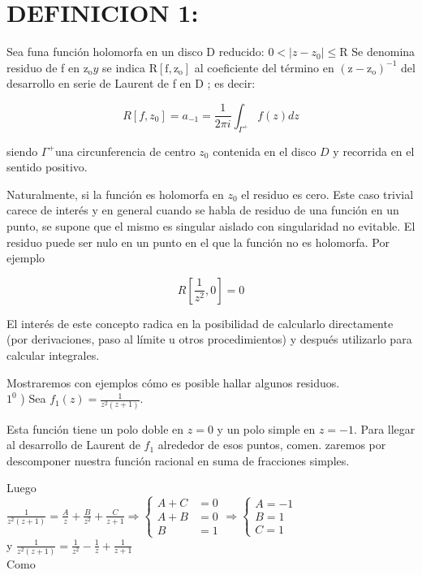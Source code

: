 \documentclass[10pt]{article}
\theoremstyle{plain}
\theoremstyle{definition}
\theoremstyle{remark}
\begin{document}
\section*{DEFINICION 1:}
Sea funa función holomorfa en un disco D reducido: $0<\left|z-z_{0}\right| \leqslant \mathrm{R}$ Se denomina residuo de f en $\mathrm{z}_{\mathrm{o}} y$ se indica $\mathrm{R}\left[\mathrm{f}, \mathrm{z}_{\mathrm{o}}\right]$ al coeficiente del término en $\left(\mathrm{z}-\mathrm{z}_{\mathrm{o}}\right)^{-1}$ del desarrollo en serie de Laurent de f en D ; es decir:


\begin{equation*}
R\left[f, z_{0}\right]=a_{-1}=\frac{1}{2 \pi i} \int_{\Gamma^{+}} f(z) d z \tag{20-1}
\end{equation*}


siendo $\Gamma^{+}$una circunferencia de centro $z_{0}$ contenida en el disco $D$ y recorrida en el sentido positivo.

Naturalmente, si la función es holomorfa en $z_{0}$ el residuo es cero. Este caso trivial carece de interés y en general cuando se habla de residuo de una función en un punto, se supone que el mismo es singular aislado con singularidad no evitable. El residuo puede ser nulo en un punto en el que la función no es holomorfa. Por ejemplo

$$
R\left[\frac{1}{z^{2}}, 0\right]=0
$$

El interés de este concepto radica en la posibilidad de calcularlo directamente (por derivaciones, paso al límite u otros procedimientos) y después utilizarlo para calcular integrales.

Mostraremos con ejemplos cómo es posible hallar algunos residuos.\\
$1^{0}$ ) Sea $f_{1}(z)=\frac{1}{z^{2}(z+1)}$.

Esta función tiene un polo doble en $z=0$ y un polo simple en $z=-1$. Para llegar al desarrollo de Laurent de $f_{1}$ alrededor de esos puntos, comen. zaremos por descomponer nuestra función racional en suma de fracciones simples.

Luego\\
$\frac{1}{z^{2}(z+1)}=\frac{A}{z}+\frac{B}{z^{2}}+\frac{C}{z+1} \Longrightarrow\left\{\begin{aligned} A+C & =0 \\ A+B & =0 \\ B & =1\end{aligned} \Longrightarrow\left\{\begin{array}{c}A=-1 \\ B=1 \\ C=1\end{array}\right.\right.$\\
y $\frac{1}{z^{2}(z+1)}=\frac{1}{z^{2}}-\frac{1}{z}+\frac{1}{z+1}$\\
Como
\end{document}
